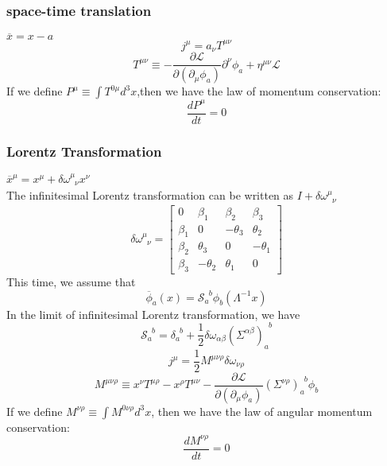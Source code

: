 \documentclass[cyan]{elegantnote}
\begin{document}
\subsubsection{space-time translation}
\noindent
$\overline{x} = x - a$ 
\[j^{\mu} = a_{\nu} T^{\mu \nu}\]
\[T^{\mu \nu} \equiv -\frac{\partial \mathcal{L}}{\partial(\partial_{\mu}\phi_a)} \partial^{\nu} \phi_a + \eta^{\mu \nu} \mathcal{L}\]
If we define $P^{\mu} \equiv \int T^{0 \mu} d^3 x$,then we have the law of momentum conservation:
\[\frac{d P^{\mu}}{dt} = 0\]

\subsubsection{Lorentz Transformation} 
\noindent
$\overline{x}^{\mu} = x^{\mu} + \delta \omega^{\mu}_{\phantom{\mu}\nu} x^{\nu}$\\
The infinitesimal Lorentz transformation can be written as $I+\delta \omega^{\mu}_{\phantom{\mu}\nu}$
\[\delta \omega^{\mu}_{\phantom{\mu}\nu} = \left[ 
\begin{matrix} 
0       & \beta_1   & \beta_2   & \beta_3   \\ 
\beta_1 & 0         & -\theta_3 & \theta_2  \\
\beta_2 & \theta_3  & 0         & -\theta_1 \\
\beta_3 & -\theta_2 & \theta_1  & 0
\end{matrix} 
\right]\]
This time, we assume that
\[\overline{\phi}_a(x) = \mathcal{S}_{a}^{\phantom{a}b}\phi_b(\Lambda^{-1}x)\]
In the limit of infinitesimal Lorentz transformation, we have
\[\mathcal{S}_{a}^{\phantom{a}b} = \delta_{a}^{\phantom{a}b}+\frac{1}{2} \delta \omega_{\alpha \beta} (\Sigma^{\alpha \beta})_{a}^{\phantom{a}b} \]
\[j^{\mu} = \frac{1}{2} M^{\mu \nu \rho}  \delta \omega_{\nu \rho}\]
\[M^{\mu \nu \rho} \equiv x^{\nu}T^{\mu \rho} - x^{\rho} T^{\mu \nu} - \frac{\partial \mathcal{L}}{\partial (\partial_{\mu}\phi_a)}(\Sigma^{\nu \rho})_{a}^{\phantom{a}b}\phi_b\]
If we define $M^{\nu \rho} \equiv \int M^{0 \nu \rho} d^3 x$, then we have the law of angular momentum conservation:
\[\frac{dM^{\nu \rho}}{dt} = 0\]
\end{document}
